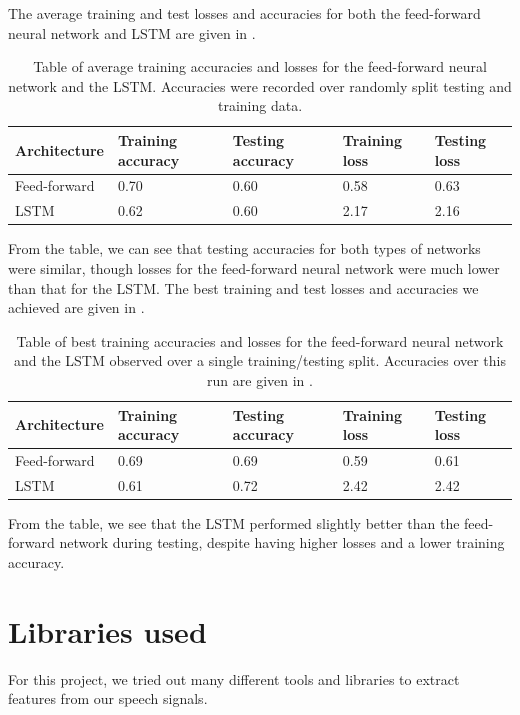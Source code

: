 \documentclass{article}
\begin{document}
The average training and test losses and accuracies for both the feed-forward neural network and LSTM are given in .
\begin{table}[ht]
	\centering
	\begin{tabularx}{\linewidth}{|X|X|X|X|X|}
		\hline
		Ar\-chi\-tec\-ture & Training accuracy & Testing accuracy & Training loss & Testing loss \\
		\hline
		Feed-forward & 0.70 & 0.60 & 0.58 & 0.63 \\
		\hline
		LSTM & 0.62 & 0.60 & 2.17 & 2.16 \\
		\hline
	\end{tabularx}
	\caption{Table of average training accuracies and losses for the feed-forward neural network and the LSTM. Accuracies were recorded over randomly split testing and training data.}
	\label{tab:avg_acc}
\end{table}
From the table, we can see that testing accuracies for both types of networks were similar, though losses for the feed-forward neural network were much lower than that for the LSTM.
The best training and test losses and accuracies we achieved are given in .
\begin{table}[ht]
	\centering
	\begin{tabularx}{\linewidth}{|X|X|X|X|X|}
		\hline
		Ar\-chi\-tec\-ture & Training accuracy & Testing accuracy & Training loss & Testing loss \\
		\hline
		Feed-forward & 0.69 & 0.69 & 0.59 & 0.61 \\
		\hline
		LSTM & 0.61 & 0.72 & 2.42 & 2.42 \\
		\hline
	\end{tabularx}
	\caption{Table of best training accuracies and losses for the feed-forward neural network and the LSTM observed over a single training/testing split. Accuracies over this run are given in .}
	\label{tab:best_acc}
\end{table}
From the table, we see that the LSTM performed slightly better than the feed-forward network during testing, despite having higher losses and a lower training accuracy.

\section{Libraries used}
\label{sec:libraries}

For this project, we tried out many different tools and libraries to extract features from our speech signals.
\end{document}
